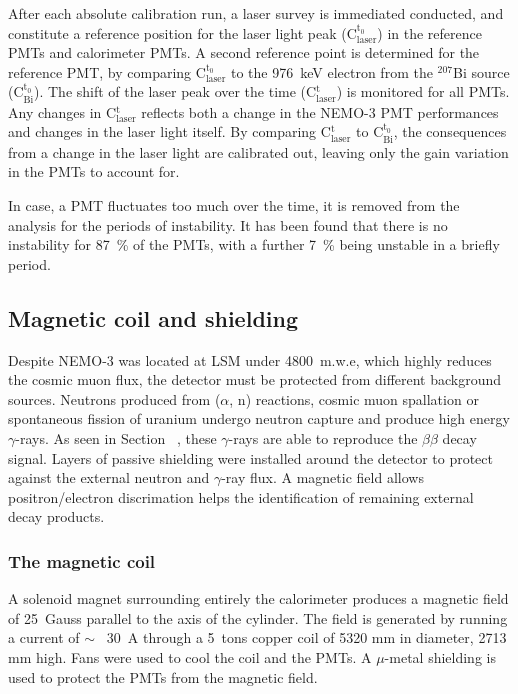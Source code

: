 \documentclass[main.tex]{subfiles}
\begin{document}
\bigskip


\NI After each absolute calibration run, a laser survey is immediated conducted, and constitute a reference position for the laser light peak (C$^{\text{t}_\text{0}}_{\text{laser}}$) in the reference PMTs and calorimeter PMTs. A second reference point is determined for the reference PMT, by comparing C$^{\text{t}_\text{0}}_{\text{laser}}$ to the 976~keV electron from the $^{\text{207}}$Bi source (C$^{\text{t}_\text{0}}_{\text{Bi}}$). The shift of the laser peak over the time (C$^{\text{t}}_{\text{laser}}$) is monitored for all PMTs. Any changes in C$^{\text{t}}_{\text{laser}}$ reflects both a change in the NEMO-3 PMT performances and changes in the laser light itself. By comparing C$^{\text{t}}_{\text{laser}}$ to C$^{\text{t}_\text{0}}_{\text{Bi}}$, the consequences from a change in the laser light are calibrated out, leaving only the gain variation in the PMTs to account for.


\bigskip


\NI In case, a PMT fluctuates too much over the time, it is removed from the analysis for the periods of instability. It has been found that there is no instability for 87~\% of the PMTs, with a further 7~\% being unstable in a briefly period.

\subsection{Magnetic coil and shielding}


\NI Despite NEMO-3 was located at LSM under 4800~m.w.e, which highly reduces the cosmic muon flux, the detector must be protected from different background sources. Neutrons produced from ($\alpha$, n) reactions, cosmic muon spallation or spontaneous fission of uranium undergo neutron capture and produce high energy $\gamma$-rays. As seen in Section~ , these $\gamma$-rays are able to reproduce the $\beta\beta$ decay signal. Layers of passive shielding were installed around the detector to protect against the external neutron and $\gamma$-ray flux. A magnetic field allows positron/electron discrimation helps the identification of remaining external decay products.


\subsubsection{The magnetic coil}


\NI A solenoid magnet surrounding entirely the calorimeter produces a magnetic field of 25~Gauss parallel to the axis of the cylinder. The field is generated by running a current of $\sim$~ 30~A through a 5~tons copper coil of 5320 mm in diameter, 2713 mm high. Fans were used to cool the coil and the PMTs. A $\mu$-metal shielding is used to protect the PMTs from the magnetic field. 
\end{document}
